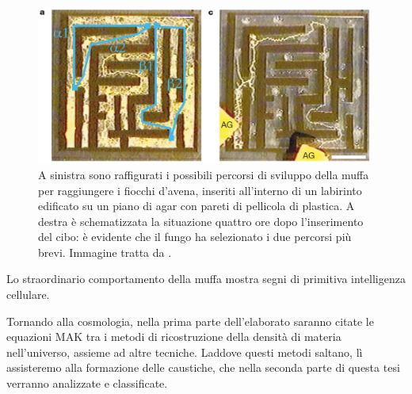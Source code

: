 \begin{center}
	\begin{figure}[H]
		\centering
		\includegraphics[scale=0.3, angle=0]{yamada.png}
		\caption{A sinistra sono raffigurati i possibili percorsi di sviluppo della muffa per raggiungere i fiocchi d'avena, inseriti all'interno 
		di un labirinto edificato su un piano di agar con pareti di pellicola di plastica. A destra	è schematizzata la situazione quattro ore dopo
		l'inserimento del cibo: è evidente che il fungo ha selezionato i due percorsi più brevi. Immagine tratta da \cite{yamada}.}
		\label{fig:yamada}
	\end{figure}
\end{center}
Lo straordinario comportamento della muffa mostra segni di primitiva intelligenza cellulare.

Tornando alla cosmologia, nella prima parte dell'elaborato saranno citate le equazioni MAK tra i metodi di ricostruzione della densità di materia
nell'universo, assieme ad altre tecniche. Laddove questi metodi saltano, lì assisteremo alla 
formazione delle caustiche, che nella seconda parte di questa tesi verranno analizzate e classificate.